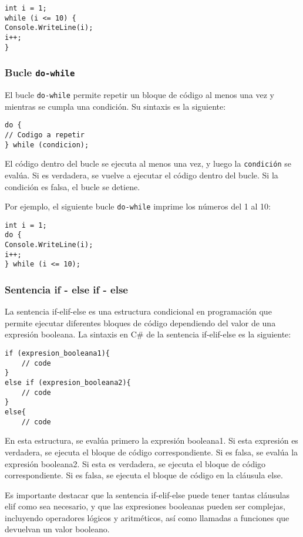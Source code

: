\documentclass[executivepaper]{article}
\begin{document}
\begin{lstlisting}
int i = 1;
while (i <= 10) {
Console.WriteLine(i);
i++;
}
\end{lstlisting}

\subsubsection*{Bucle \texttt{do-while}}

El bucle \verb|do-while| permite repetir un bloque de código al menos una vez y mientras se cumpla una condición. Su sintaxis es la siguiente:

\begin{lstlisting}
do {
// Codigo a repetir
} while (condicion);
\end{lstlisting}

El código dentro del bucle se ejecuta al menos una vez, y luego la \texttt{condición} se evalúa. Si es verdadera, se vuelve a ejecutar el código dentro del bucle. Si la condición es falsa, el bucle se detiene.

Por ejemplo, el siguiente bucle \verb|do-while| imprime los números del 1 al 10:

\begin{lstlisting}
int i = 1;
do {
Console.WriteLine(i);
i++;
} while (i <= 10);
\end{lstlisting}

\subsubsection*{Sentencia if - else if - else}
La sentencia if-elif-else es una estructura condicional en programación que permite ejecutar diferentes bloques de código dependiendo del valor de una expresión booleana. La sintaxis en C\# de la sentencia if-elif-else es la siguiente:
\begin{lstlisting}
if (expresion_booleana1){
    // code
}
else if (expresion_booleana2){
    // code
}
else{
    // code
\end{lstlisting}
En esta estructura, se evalúa primero la expresión booleana1. Si esta expresión es verdadera, se ejecuta el bloque de código correspondiente. Si es falsa, se evalúa la expresión booleana2. Si esta es verdadera, se ejecuta el bloque de código correspondiente. Si es falsa, se ejecuta el bloque de código en la cláusula else.

Es importante destacar que la sentencia if-elif-else puede tener tantas cláusulas elif como sea necesario, y que las expresiones booleanas pueden ser complejas, incluyendo operadores lógicos y aritméticos, así como llamadas a funciones que devuelvan un valor booleano.
\end{document}
